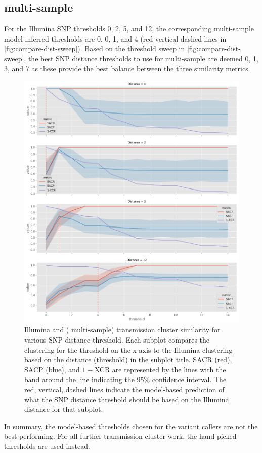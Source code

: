 \subsection{\pandora{} multi-sample}

For the Illumina SNP thresholds 0, 2, 5, and 12, the corresponding \pandora{} multi-sample model-inferred thresholds are 0, 0, 1, and 4 (red vertical dashed lines in \autoref{fig:compare-dist-sweep}). Based on the threshold sweep in \autoref{fig:compare-dist-sweep}, the best SNP distance thresholds to use for \pandora{} multi-sample are deemed 0, 1, 3, and 7 as these provide the best balance between the three similarity metrics.

\begin{figure}
\begin{center}
\includegraphics[width=0.90\columnwidth]{Appendix1/Figs/compare-threshold-sweep.png}
\caption{{Illumina and \ont{} (\pandora{} multi-sample) transmission cluster similarity for various SNP distance threshold. Each subplot compares the \ont{} clustering for the threshold on the x-axis to the Illumina clustering based on the distance (threshold) in the subplot title. SACR (red), SACP (blue), and $1-$XCR are represented by the lines with the band around the line indicating the 95\% confidence interval. The red, vertical, dashed lines indicate the model-based prediction of what the \ont{} SNP distance threshold should be based on the Illumina distance for that subplot.
{\label{fig:compare-dist-sweep}}%
}}
\end{center}
\end{figure}

In summary, the model-based thresholds chosen for the \ont{} variant callers are not the best-performing. For all further transmission cluster work, the hand-picked thresholds are used instead.